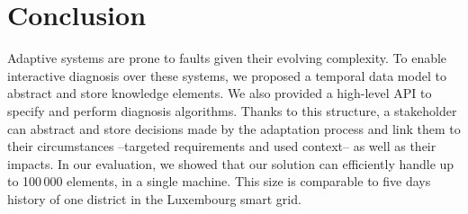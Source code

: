 \section{Conclusion}
\label{sec:tkm:conclusion}

Adaptive systems are prone to faults  given their evolving complexity.
To enable interactive diagnosis over these systems, we proposed a temporal data model to abstract and store knowledge elements. We also provided a high-level API to specify and perform diagnosis algorithms.
Thanks to this structure, a stakeholder can abstract and store decisions made by the adaptation process and link them to their circumstances --targeted requirements and used context-- as well as their impacts.
In our evaluation, we showed that our solution can efficiently handle up to 100\,000 elements, in a single machine.
This size is comparable to five days history of one district in the Luxembourg smart grid.


